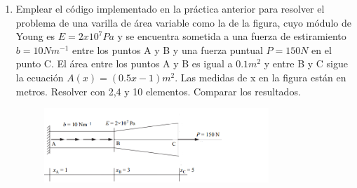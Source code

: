 \documentclass[12pt,a4paper]{article}
\title{\mathbf{Elementos Finitos \\Práctica 2}}
\author{Universidad de Cuenca}
\begin{document}
\maketitle
\begin{enumerate}
    \item Emplear el código implementado en la práctica anterior para resolver el problema de una varilla de área variable como la de la figura, cuyo módulo de Young es $E=2x10^7Pa$ y se encuentra sometida a una fuerza de estiramiento $b=10Nm^{-1}$ entre los puntos  A y B y una fuerza puntual $P=150N$ en el punto C. El área entre los puntos A y B es igual a $0.1 m^2$ y entre B y C sigue la ecuación $A(x)=(0.5x-1)m^2$. Las medidas de x en la figura están en metros. Resolver con 2,4 y 10 elementos. Comparar los resultados.
    \begin{figure}[H]
        \centering
        \includegraphics[width=0.8\textwidth]{tp2-1.png}
        \label{fig:ejercicio1}
    \end{figure}
\end{enumerate}
\end{document}
